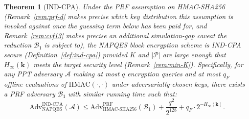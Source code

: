 \documentclass[11pt,a4paper]{article}
\newtheorem{theorem}{Theorem}[section]
\begin{document}
\begin{theorem}[IND-CPA]\label{thm:ind-cpa}
  Under the PRF assumption on HMAC-SHA256 (Remark~\ref{rem:prf-d} makes
  precise which key distribution this assumption is invoked against once
  the guessing term below has been paid for, and Remark~\ref{rem:cvf13}
  makes precise an additional simulation-gap caveat the reduction $\mathcal{B}_1$
  is subject to), the NAPQES block encryption
  scheme is IND-CPA secure (Definition~\ref{def:ind-cpa}) provided $K$ and
  $|\mathcal{P}|$ are large enough
  that $H_\infty(\mathbf{k})$ meets the target security level
  (Remark~\ref{rem:min-K}). Specifically, for any PPT adversary
  $\mathcal{A}$ making at most $q$ encryption queries and at most $q_F$
  offline evaluations of $\mathrm{HMAC}(\cdot,\cdot)$ under
  adversarially-chosen keys, there exists a PRF adversary $\mathcal{B}_1$
  with similar running time such that:
  \[
    \mathrm{Adv}^{\mathrm{IND\text{-}CPA}}_{\mathrm{NAPQES}}(\mathcal{A})
    \leq
    \mathrm{Adv}^{\mathrm{PRF}}_{\mathrm{HMAC\text{-}SHA256}}(\mathcal{B}_1)
    + \frac{q^2}{2^{128}}
    + q_F \cdot 2^{-H_\infty(\mathbf{k})}.
  \]
\end{theorem}
\end{document}
